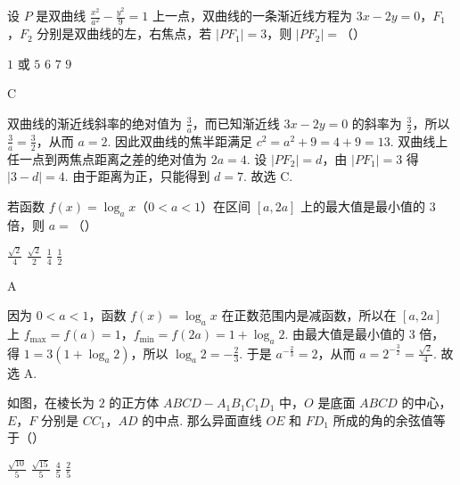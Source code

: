 \begin{problem}
设 \(P\) 是双曲线 \(\frac{x^2}{a^2} - \frac{y^2}{9} = 1\) 上一点，双曲线的一条渐近线方程为 \(3x - 2y = 0\)，\(F_1\)，\(F_2\) 分别是双曲线的左，右焦点，若 \(\left|PF_1\right| = 3\)，则 \(\left|PF_2\right| =\)（\quad）

\choices
    {\(1\) 或 \(5\)}
    {\(6\)}
    {\(7\)}
    {\(9\)}
\end{problem}

\begin{answer}
C
\end{answer}

\begin{solution}
双曲线的渐近线斜率的绝对值为 \(\frac{3}{a}\)，而已知渐近线 \(3x-2y=0\) 的斜率为 \(\frac32\)，所以 \(\frac{3}{a}=\frac32\)，从而 \(a=2\). 因此双曲线的焦半距满足 \(c^2=a^2+9=4+9=13\).
双曲线上任一点到两焦点距离之差的绝对值为 \(2a=4\). 设 \(|PF_2|=d\)，由 \(|PF_1|=3\) 得 \(|3-d|=4\).
由于距离为正，只能得到 \(d=7\). 故选 C.
\end{solution}

\begin{problem}
若函数 \(f(x) = \log_a x\)（\(0 < a < 1\)）在区间 \([a, 2a]\) 上的最大值是最小值的 \(3\) 倍，则 \(a =\)（\quad）

\choices
    {\(\frac{\sqrt{2}}{4}\)}
    {\(\frac{\sqrt{2}}{2}\)}
    {\(\frac{1}{4}\)}
    {\(\frac{1}{2}\)}
\end{problem}

\begin{answer}
A
\end{answer}

\begin{solution}
因为 \(0<a<1\)，函数 \(f(x)=\log_a x\) 在正数范围内是减函数，所以在 \([a,2a]\) 上
\(f_{\max}=f(a)=1\)，\(f_{\min}=f(2a)=1+\log_a2\).
由最大值是最小值的 \(3\) 倍，得 \(1=3(1+\log_a2)\)，所以 \(\log_a2=-\frac23\). 于是 \(a^{-\frac{2}{3}}=2\)，从而 \(a=2^{-\frac{3}{2}}=\frac{\sqrt2}{4}\).
故选 A.
\end{solution}

\begin{problem}
如图，在棱长为 \(2\) 的正方体 \(ABCD - A_{1}B_{1}C_{1}D_{1}\) 中，\(O\) 是底面 \(ABCD\) 的中心，\(E\)，\(F\) 分别是 \(CC_{1}\)，\(AD\) 的中点. 那么异面直线 \(OE\) 和 \(FD_{1}\) 所成的角的余弦值等于（\quad）


\choices
    {\(\frac{\sqrt{10}}{5}\)}
    {\(\frac{\sqrt{15}}{5}\)}
    {\(\frac{4}{5}\)}
    {\(\frac{2}{5}\)}
\end{problem}

